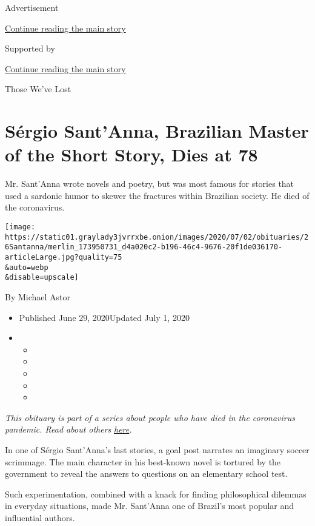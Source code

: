 Advertisement

\protect\hyperlink{after-top}{Continue reading the main story}

Supported by

\protect\hyperlink{after-sponsor}{Continue reading the main story}

Those We've Lost

\hypertarget{suxe9rgio-santanna-brazilian-master-of-the-short-story-dies-at-78}{%
\section{Sérgio Sant'Anna, Brazilian Master of the Short Story, Dies at
78}\label{suxe9rgio-santanna-brazilian-master-of-the-short-story-dies-at-78}}

Mr. Sant'Anna wrote novels and poetry, but was most famous for stories
that used a sardonic humor to skewer the fractures within Brazilian
society. He died of the coronavirus.

\texttt{[image: https://static01.graylady3jvrrxbe.onion/images/2020/07/02/obituaries/26Santanna/merlin\_173950731\_d4a020c2-b196-46c4-9676-20f1de036170-articleLarge.jpg?quality=75\\\&auto=webp\\\&disable=upscale]}

By Michael Astor

\begin{itemize}
\item
  Published June 29, 2020Updated July 1, 2020
\item
  \begin{itemize}
  \item
  \item
  \item
  \item
  \item
  \end{itemize}
\end{itemize}

\emph{This obituary is part of a series about people who have died in
the coronavirus pandemic. Read about others}
\href{https://www.nytimes3xbfgragh.onion/interactive/2020/obituaries/people-died-coronavirus-obituaries.html}{\emph{here}}\emph{.}

In one of Sérgio Sant'Anna's last stories, a goal post narrates an
imaginary soccer scrimmage. The main character in his best-known novel
is tortured by the government to reveal the answers to questions on an
elementary school test.

Such experimentation, combined with a knack for finding philosophical
dilemmas in everyday situations, made Mr. Sant'Anna one of Brazil's most
popular and influential authors.

